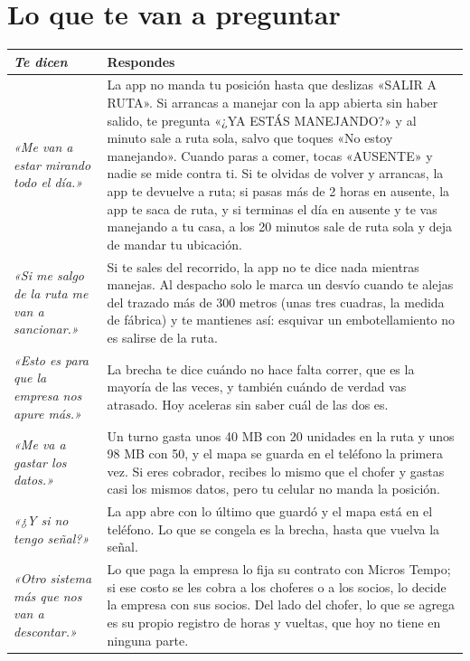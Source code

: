 \documentclass[a4paper]{article}
\begin{document}
\section{Lo que te van a preguntar}

\begin{center}
\begin{tabularx}{\linewidth}{@{}>{\itshape}p{4.6cm}X@{}}
\toprule
\normalfont\textbf{Te dicen} & \textbf{Respondes}\\
\midrule
«Me van a estar mirando todo el día.» & La app no manda tu posición hasta que deslizas «SALIR A RUTA». Si arrancas a manejar con la app abierta sin haber salido, te pregunta «¿YA ESTÁS MANEJANDO?» y al minuto sale a ruta sola, salvo que toques «No estoy manejando». Cuando paras a comer, tocas «AUSENTE» y nadie se mide contra ti. Si te olvidas de volver y arrancas, la app te devuelve a ruta; si pasas más de 2 horas en ausente, la app te saca de ruta, y si terminas el día en ausente y te vas manejando a tu casa, a los 20 minutos sale de ruta sola y deja de mandar tu ubicación.\\
«Si me salgo de la ruta me van a sancionar.» & Si te sales del recorrido, la app no te dice nada mientras manejas. Al despacho solo le marca un desvío cuando te alejas del trazado más de 300 metros (unas tres cuadras, la medida de fábrica) y te mantienes así: esquivar un embotellamiento no es salirse de la ruta.\\
«Esto es para que la empresa nos apure más.» & La brecha te dice cuándo no hace falta correr, que es la mayoría de las veces, y también cuándo de verdad vas atrasado. Hoy aceleras sin saber cuál de las dos es.\\
«Me va a gastar los datos.» & Un turno gasta unos 40 MB con 20 unidades en la ruta y unos 98 MB con 50, y el mapa se guarda en el teléfono la primera vez. Si eres cobrador, recibes lo mismo que el chofer y gastas casi los mismos datos, pero tu celular no manda la posición.\\
«¿Y si no tengo señal?» & La app abre con lo último que guardó y el mapa está en el teléfono. Lo que se congela es la brecha, hasta que vuelva la señal.\\
«Otro sistema más que nos van a descontar.» & Lo que paga la empresa lo fija su contrato con Micros Tempo; si ese costo se les cobra a los choferes o a los socios, lo decide la empresa con sus socios. Del lado del chofer, lo que se agrega es su propio registro de horas y vueltas, que hoy no tiene en ninguna parte.\\
\bottomrule
\end{tabularx}
\end{center}
\end{document}
